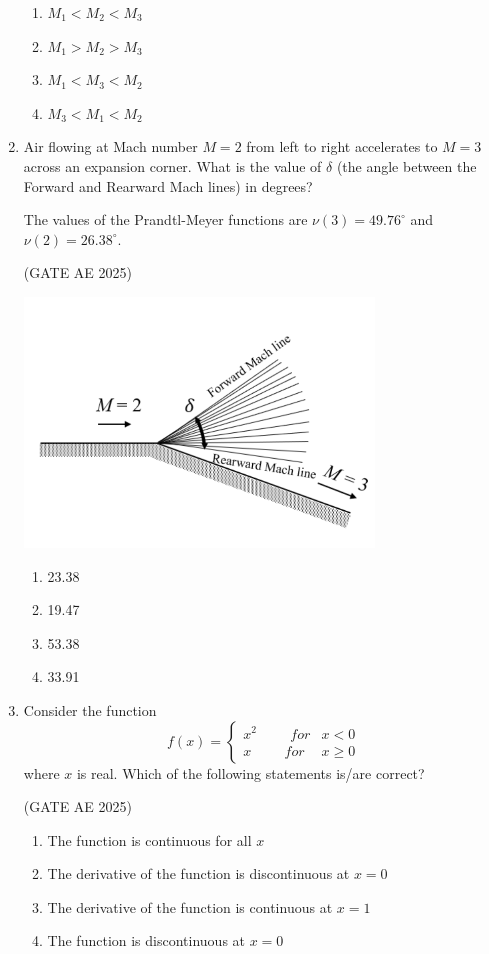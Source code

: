 \documentclass[journal,12pt,onecolumn]{IEEEtran}
\theoremstyle{remark}
\begin{document}
\begin{flushleft}
\begin{enumerate}
\begin{enumerate}
\item $M_1 < M_2 < M_3$  
\item $M_1 > M_2 > M_3$  
\item $M_1 < M_3 < M_2$  
\item $M_3 < M_1 < M_2$  
\end{enumerate}

\item Air flowing at Mach number $M = 2$ from left to right accelerates to $M = 3$ across an expansion corner. What is the value of $\delta$ (the angle between the Forward and Rearward Mach lines) in degrees? 

The values of the Prandtl-Meyer functions are $\nu(3) = 49.76^\circ$ and $\nu(2) = 26.38^\circ$. 

\hfill (GATE AE 2025)

\begin{center}
\includegraphics[width=0.5\columnwidth]{figs/44.png}
\caption{}
    \label{fig:placeholder}
\end{center}

\begin{enumerate}
\item 23.38  
\item 19.47  
\item 53.38  
\item 33.91
\end{enumerate}  

\item Consider the function  
\[
f(x) =
\begin{cases}
x^2 \hspace{1cm} for & x < 0 \\
x \hspace{1cm} for & x \ge 0
\end{cases}
\]  
where $x$ is real. Which of the following statements is/are correct?  

\hfill (GATE AE 2025)

\begin{enumerate}
\item The function is continuous for all $x$  
\item The derivative of the function is discontinuous at $x = 0$  
\item The derivative of the function is continuous at $x = 1$  
\item The function is discontinuous at $x = 0$ 
\end{enumerate}


\end{enumerate}
\end{flushleft}
\end{document}
